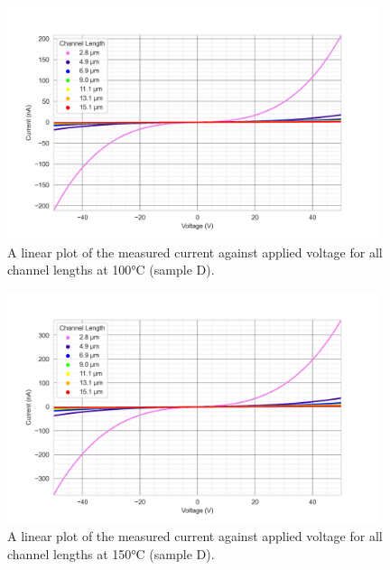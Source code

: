 \begin{figure}[h]
    \centering
    \includegraphics[width=0.97\textwidth]{Chapter3/Figs/Raster/Sample D 2019/IV/50v IV characteristics at 100 C.png}
    \caption{A linear plot of the measured current against applied voltage for all channel lengths at 100\si{\degreeCelsius} (sample D).}
    \label{appfig:D_current_voltage_100_50v}
\end{figure}
\begin{figure}[h]
    \centering
    \includegraphics[width=0.97\textwidth]{Chapter3/Figs/Raster/Sample D 2019/IV/50v IV characteristics at 150 C.png}
    \caption{A linear plot of the measured current against applied voltage for all channel lengths at 150\si{\degreeCelsius} (sample D).}
    \label{appfig:D_current_voltage_150_50v}
\end{figure}
